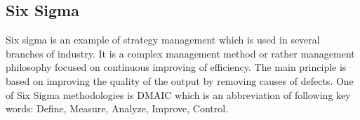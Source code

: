 \subsection{Six Sigma}
Six sigma is an example of strategy management which is used in several branches of industry. It is a complex management method or rather management philosophy focused on continuous improving of efficiency. The main principle is based on improving the quality of the output by removing causes of defects. One of Six Sigma methodologies is DMAIC which is an abbreviation of following key words: Define, Measure, Analyze, Improve, Control.

\sediva{\blindtext}
\sediva{\blindtext}
\sediva{\blindtext}
\sediva{\blindtext}




